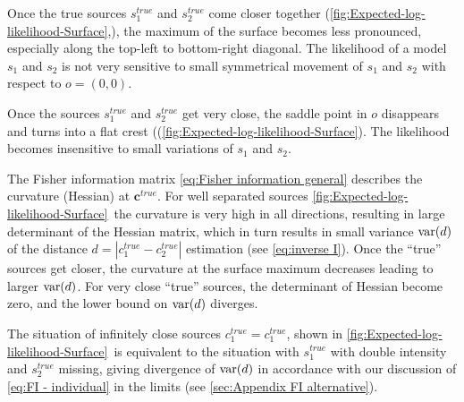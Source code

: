 Once the true sources $s_1^{true}$ and $s_2^{true}$ come closer together (\autoref{fig:Expected-log-likelihood-Surface}\bbb,\ccc), the maximum of the surface becomes less pronounced, especially along the top-left to bottom-right diagonal. The likelihood of a model $s_1$ and $s_2$ is not very sensitive to small symmetrical movement of $s_1$ and $s_2$ with respect to $o=(0,0)$. 

Once the sources $s_1^{true}$ and $s_2^{true}$ get very close, the saddle point in $o$ disappears and turns into a flat crest ((\autoref{fig:Expected-log-likelihood-Surface}\ddd). The likelihood becomes insensitive to small variations of $s_1$ and $s_2$. 

The Fisher information matrix \autoref{eq:Fisher information general} describes the curvature (Hessian) at $\bm{c}^{true}$. For well separated sources \autoref{fig:Expected-log-likelihood-Surface}\aaa\ the curvature is very high in all directions, resulting in large determinant of the Hessian matrix, which in turn results in small variance $\mathrm{var}(d)$ of the distance $d=\left|c_1^{true}-c_2^{true}\right|$ estimation  (see \autoref{eq:inverse I}). Once the ``true'' sources get closer, the curvature at the surface maximum decreases leading to larger $\mathrm{var}(d)$. For very close ``true'' sources, the determinant of Hessian become zero, and the lower bound on $\mathrm{var}(d)$ diverges. 

The situation of infinitely close sources $c_1^{true}=c_1^{true}$, shown in \autoref{fig:Expected-log-likelihood-Surface}\ddd\  is equivalent to the situation with $s_1^{true}$ with double intensity and $s_2^{true}$ missing, giving divergence of $\mathrm{var}(d)$ in accordance with our discussion of \autoref{eq:FI - individual} in the limits  (see \autoref{sec:Appendix FI alternative}).

